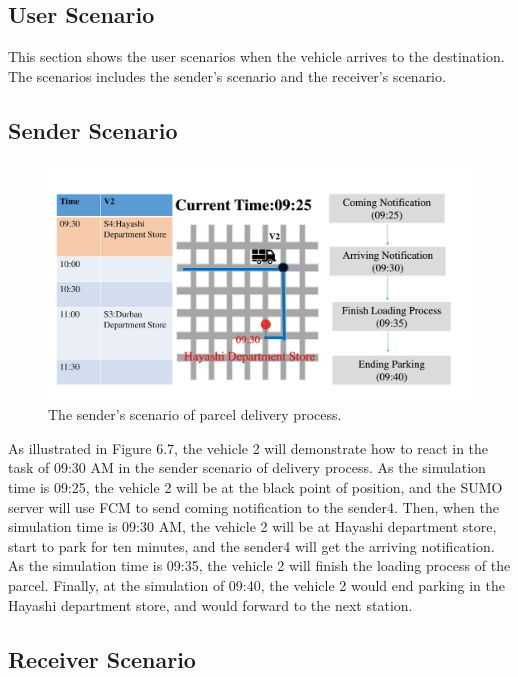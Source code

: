 \documentclass[12pt]{ksthesis}
\begin{document}
\begin{thesis}
{\section{User Scenario}

This section shows the user scenarios when the vehicle arrives to the destination. The scenarios includes the sender's scenario and the receiver's scenario.

\subsection{Sender Scenario}

\begin{figure}[H]
\centering
\includegraphics[width=1.14\textwidth]{./Thesis_figures/F6-7_senderScenario.PNG}
\caption{\large The sender's scenario of parcel delivery process.}
\vspace{0.5cm}
\label{Fig:senderScenario_DeliveryPorcess}
\end{figure}

As illustrated in Figure 6.7, the vehicle 2 will demonstrate how to react in the task of 09:30 AM in the sender scenario of delivery process. As the simulation time is 09:25, the vehicle 2 will be at the black point of position, and the SUMO server will use FCM to send coming notification to the sender4. Then, when the simulation time is 09:30 AM, the vehicle 2 will be at Hayashi department store, start to park for ten minutes, and the sender4 will get the arriving notification.
As the simulation time is 09:35, the vehicle 2 will finish the loading process of the parcel. Finally, at the simulation of 09:40, the vehicle 2 would end parking in the Hayashi department store, and would forward to the next station.

\subsection{Receiver Scenario}

}
\end{thesis}
\end{document}
